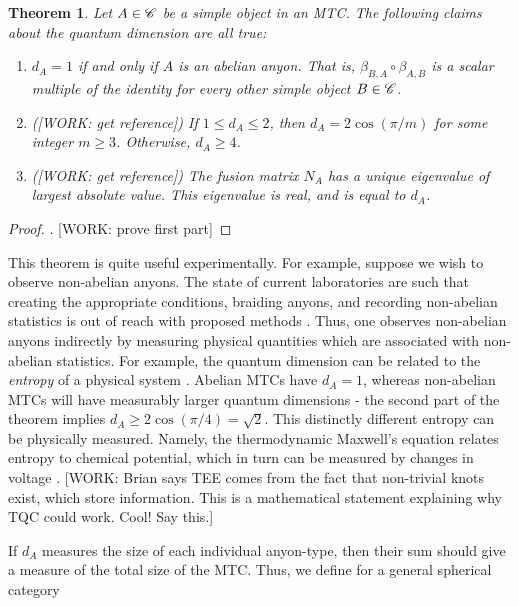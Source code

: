 \documentclass{article}
\newtheorem{theorem}{Theorem}[section]
\theoremstyle{definition}
\numberwithin{figure}{section}
\begin{document}
\begin{theorem} Let $A\in \mathscr{C}$ be a simple object in an MTC. The following claims about the quantum dimension are all true:

\begin{enumerate}

\item $d_A=1$ if and only if $A$ is an abelian anyon. That is, $\beta_{B,A}\circ \beta_{A,B}$ is a scalar multiple of the identity for every other simple object $B\in \mathscr{C}$.

\item ([WORK: get reference]) If $1\leq d_A\leq 2$, then $d_A=2\cos(\pi /m)$ for some integer $m\geq 3$. Otherwise, $d_A\geq 4$.

\item ([WORK: get reference]) The fusion matrix $N_A$ has a unique eigenvalue of largest absolute value. This eigenvalue is real, and is equal to $d_A$.
\end{enumerate}
\end{theorem}
\begin{proof}. [WORK: prove first part]
\end{proof}

This theorem is quite useful experimentally. For example, suppose we wish to observe non-abelian anyons. The state of current laboratories are such that creating the appropriate conditions, braiding anyons, and recording non-abelian statistics is out of reach with proposed methods \cite{bonderson2006probing}. Thus, one observes non-abelian anyons indirectly by measuring physical quantities which are associated with non-abelian statistics. For example, the quantum dimension can be related to the \textit{entropy} of a physical system \cite{kitaev2006topological}. Abelian MTCs have $d_A=1$, whereas non-abelian MTCs will have measurably larger quantum dimensions - the second part of the theorem implies $d_A\geq 2\cos(\pi/4)=\sqrt{2}$. This distinctly different entropy can be physically measured. Namely, the thermodynamic Maxwell's equation relates entropy to chemical potential, which in turn can be measured by changes in voltage \cite{cooper2009observable}. [WORK: Brian says TEE comes from the fact that non-trivial knots exist, which store information. This is a mathematical statement explaining why TQC could work. Cool! Say this.]

If $d_A$ measures the size of each individual anyon-type, then their sum should give a measure of the total size of the MTC. Thus, we define for a general spherical category
\end{document}
